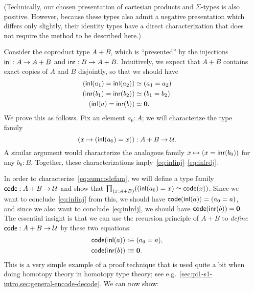(Technically, our chosen presentation of cartesian products and $\Sigma$-types is also positive.
However, because these types also admit a negative presentation which differs only slightly, their identity types have a direct characterization that does not require the method to be described here.)

Consider the coproduct type $A+B$, which is ``presented'' by the injections ${\mathsf{inl}}:A\to A+B$ and ${\mathsf{inr}}:B\to A+B$.
Intuitively, we expect that $A+B$ contains exact copies of $A$ and $B$ disjointly, so that we should have
\begin{align}
  {(\inl(a_1)=\inl(a_2))}&\eqvsym {(a_1=a_2)} \label{eq:inlinj}\\
  {(\inr(b_1)=\inr(b_2))}&\eqvsym {(b_1=b_2)}\\
  {(\inl(a)= \inr(b))} &\eqvsym {\emptyt}. \label{eq:inlrdj}
\end{align}
We prove this as follows.
Fix an element $a_0:A$; we will characterize the type family
\begin{equation}
  (x\mapsto (\inl(a_0)=x)) : A+B \to \type.\label{eq:sumcodefam}
\end{equation}
A similar argument would characterize the analogous family $x\mapsto (x = {\mathsf{inr}}(b_0))$ for any $b_0:B$.
Together, these characterizations imply~\eqref{eq:inlinj}--\eqref{eq:inlrdj}.

In order to characterize~\eqref{eq:sumcodefam}, we will define a type family $\mathsf{code}:A+B\to\mathcal{U}$ and show that $\prd{x:A+B} (\eqv{(\inl(a_0)=x)}{\code(x)})$.
Since we want to conclude~\eqref{eq:inlinj} from this, we should have $\mathsf{code}({\mathsf{inl}}(a)) = (a_0=a)$, and since we also want to conclude~\eqref{eq:inlrdj}, we should have $\mathsf{code} ({\mathsf{inr}}(b)) = \mathbf{0}$.
The essential insight is that we can use the recursion principle of $A+B$ to \emph{define} $\mathsf{code}:A+B\to\mathcal{U}$ by these two equations:
\begin{align*}
  \mathsf{code}({\mathsf{inl}}(a)) &\vcentcolon\equiv (a_0=a),\\
  \mathsf{code}({\mathsf{inr}}(b)) &\vcentcolon\equiv \mathbf{0}.
\end{align*}
This is a very simple example of a proof technique that is used quite a
bit when doing homotopy theory in homotopy type theory; see
e.g.\ \autoref{sec:pi1-s1-intro,sec:general-encode-decode}.
%
We can now show:

